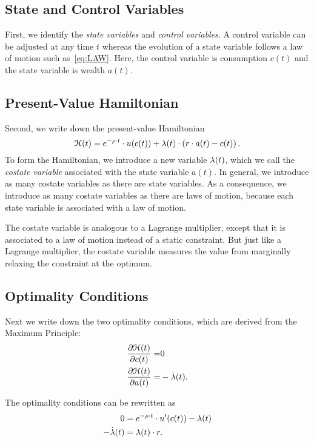 \documentclass[letterpaper,12pt,leqno]{article}
\begin{document}
\subsection{State and Control Variables}

First, we identify the \textit{state variables} and \textit{control variables}. A control variable can be adjusted at any time $t$ whereas the evolution of a state variable follows a law of motion such as~\eqref{eq:LAW}. Here, the control variable is consumption $c(t)$ and the state variable is wealth $a(t)$.

\subsection{Present-Value Hamiltonian}

Second, we write down the present-value Hamiltonian
\begin{equation*}
\mathcal{H}(t) = e^{-\rho \cdot t}\cdot u(c(t)) +\lambda(t) \cdot \left( r\cdot a(t) - c(t) \right).
\end{equation*}
To form the Hamiltonian, we introduce a new variable $\lambda(t)$, which we call the \textit{costate variable} associated with the state variable $a(t)$. In general, we introduce as many costate variables as there are state variables. As a consequence, we introduce as many costate variables as there are laws of motion, because each state variable is associated with a law of motion. 

The costate variable is analogous to a Lagrange multiplier, except that it is associated to a law of motion instead of a static constraint. But just like a Lagrange multiplier, the costate variable measures the value from marginally relaxing the constraint at the optimum.

\subsection{Optimality Conditions}  

Next we write down the two optimality conditions, which are derived from the Maximum Principle:
\begin{align}
\frac{\partial \mathcal{H}(t)}{\partial c(t)}=& 0 \label{eq:foc1}\\
\frac{\partial \mathcal{H}(t)}{\partial a(t)}=&-\dot{\lambda}(t)\label{eq:foc2}.
\end{align}

The optimality conditions can be rewritten as
\begin{align}
0 &= e^{-\rho \cdot t}\cdot u'(c(t)) -\lambda(t)\label{eq:focc} \\
-\dot{\lambda}(t)&= \lambda(t)\cdot  r  \label{eq:focs}.
\end{align}
\end{document}
